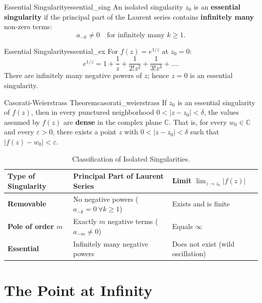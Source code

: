 \begin{definition}{Essential Singularity}{essential_sing}
An isolated singularity $z_0$ is an \textbf{essential singularity} if the principal part of the Laurent series contains \textbf{infinitely many} non-zero terms:
\begin{equation}
a_{-k} \neq 0 \quad \text{for infinitely many } k \ge 1.
\end{equation}
\end{definition}

\begin{example}{Essential Singularity}{essential_ex}
For $f(z) = e^{1/z}$ at $z_0 = 0$:
\begin{equation}
e^{1/z} = 1 + \frac{1}{z} + \frac{1}{2! z^2} + \frac{1}{3! z^3} + \dots.
\end{equation}
There are infinitely many negative powers of $z$; hence $z = 0$ is an essential singularity.
\end{example}

\begin{theorem}{Casorati-Weierstrass Theorem}{casorati_weierstrass}
If $z_0$ is an essential singularity of $f(z)$, then in every punctured neighborhood $0 < |z - z_0| < \delta$, the values assumed by $f(z)$ are \textbf{dense} in the complex plane $\mathbb{C}$. That is, for every $w_0 \in \mathbb{C}$ and every $\varepsilon > 0$, there exists a point $z$ with $0 < |z - z_0| < \delta$ such that $|f(z) - w_0| < \varepsilon$.
\end{theorem}

\begin{table}[h!]
\centering
\renewcommand{\arraystretch}{1.4}
\begin{tabular}{|l|l|l|}
\hline
\textbf{Type of Singularity} & \textbf{Principal Part of Laurent Series} & \textbf{Limit $\lim_{z \to z_0} |f(z)|$} \\ \hline
\textbf{Removable} & No negative powers ($a_{-k} = 0 \ \forall k \ge 1$) & Exists and is finite \\ \hline
\textbf{Pole of order $m$} & Exactly $m$ negative terms ($a_{-m} \neq 0$) & Equals $\infty$ \\ \hline
\textbf{Essential} & Infinitely many negative powers & Does not exist (wild oscillation) \\ \hline
\end{tabular}
\caption{Classification of Isolated Singularities.}
\end{table}


\section{The Point at Infinity}

